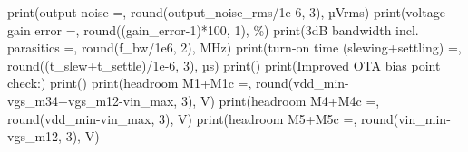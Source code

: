 \documentclass[
  a4paper,
  DIV=11,
  numbers=noendperiod]{scrartcl}
\newenvironment{Shaded}{\begin{snugshade}}{\end{snugshade}}
\newcommand{\BuiltInTok}[1]{\textcolor[rgb]{0.00,0.23,0.31}{#1}}
\newcommand{\DecValTok}[1]{\textcolor[rgb]{0.68,0.00,0.00}{#1}}
\newcommand{\FloatTok}[1]{\textcolor[rgb]{0.68,0.00,0.00}{#1}}
\newcommand{\NormalTok}[1]{\textcolor[rgb]{0.00,0.23,0.31}{#1}}
\newcommand{\OperatorTok}[1]{\textcolor[rgb]{0.37,0.37,0.37}{#1}}
\newcommand{\StringTok}[1]{\textcolor[rgb]{0.13,0.47,0.30}{#1}}
\begin{document}
\begin{tcolorbox}
\begin{Shaded}
\begin{Highlighting}[]
\BuiltInTok{print}\NormalTok{(}\StringTok{\textquotesingle{}output noise =\textquotesingle{}}\NormalTok{, }\BuiltInTok{round}\NormalTok{(output\_noise\_rms}\OperatorTok{/}\FloatTok{1e{-}6}\NormalTok{, }\DecValTok{3}\NormalTok{), }\StringTok{\textquotesingle{}µVrms\textquotesingle{}}\NormalTok{)}
\BuiltInTok{print}\NormalTok{(}\StringTok{\textquotesingle{}voltage gain error =\textquotesingle{}}\NormalTok{, }\BuiltInTok{round}\NormalTok{((gain\_error}\OperatorTok{{-}}\DecValTok{1}\NormalTok{)}\OperatorTok{*}\DecValTok{100}\NormalTok{, }\DecValTok{1}\NormalTok{), }\StringTok{\textquotesingle{}\%\textquotesingle{}}\NormalTok{)}
\BuiltInTok{print}\NormalTok{(}\StringTok{\textquotesingle{}{-}3dB bandwidth incl. parasitics =\textquotesingle{}}\NormalTok{, }\BuiltInTok{round}\NormalTok{(f\_bw}\OperatorTok{/}\FloatTok{1e6}\NormalTok{, }\DecValTok{2}\NormalTok{), }\StringTok{\textquotesingle{}MHz\textquotesingle{}}\NormalTok{)}
\BuiltInTok{print}\NormalTok{(}\StringTok{\textquotesingle{}turn{-}on time (slewing+settling) =\textquotesingle{}}\NormalTok{, }\BuiltInTok{round}\NormalTok{((t\_slew}\OperatorTok{+}\NormalTok{t\_settle)}\OperatorTok{/}\FloatTok{1e{-}6}\NormalTok{, }\DecValTok{3}\NormalTok{), }\StringTok{\textquotesingle{}µs\textquotesingle{}}\NormalTok{)}
\BuiltInTok{print}\NormalTok{()}
\BuiltInTok{print}\NormalTok{(}\StringTok{\textquotesingle{}Improved OTA bias point check:\textquotesingle{}}\NormalTok{)}
\BuiltInTok{print}\NormalTok{(}\StringTok{\textquotesingle{}{-}{-}{-}{-}{-}{-}{-}{-}{-}{-}{-}{-}{-}{-}{-}{-}{-}{-}{-}{-}{-}{-}{-}{-}{-}{-}{-}{-}{-}{-}\textquotesingle{}}\NormalTok{)}
\BuiltInTok{print}\NormalTok{(}\StringTok{\textquotesingle{}headroom M1+M1c =\textquotesingle{}}\NormalTok{, }\BuiltInTok{round}\NormalTok{(vdd\_min}\OperatorTok{{-}}\NormalTok{vgs\_m34}\OperatorTok{+}\NormalTok{vgs\_m12}\OperatorTok{{-}}\NormalTok{vin\_max, }\DecValTok{3}\NormalTok{), }\StringTok{\textquotesingle{}V\textquotesingle{}}\NormalTok{)}
\BuiltInTok{print}\NormalTok{(}\StringTok{\textquotesingle{}headroom M4+M4c =\textquotesingle{}}\NormalTok{, }\BuiltInTok{round}\NormalTok{(vdd\_min}\OperatorTok{{-}}\NormalTok{vin\_max, }\DecValTok{3}\NormalTok{), }\StringTok{\textquotesingle{}V\textquotesingle{}}\NormalTok{)}
\BuiltInTok{print}\NormalTok{(}\StringTok{\textquotesingle{}headroom M5+M5c =\textquotesingle{}}\NormalTok{, }\BuiltInTok{round}\NormalTok{(vin\_min}\OperatorTok{{-}}\NormalTok{vgs\_m12, }\DecValTok{3}\NormalTok{), }\StringTok{\textquotesingle{}V\textquotesingle{}}\NormalTok{)}
\end{Highlighting}
\end{Shaded}


\end{tcolorbox}
\end{document}

